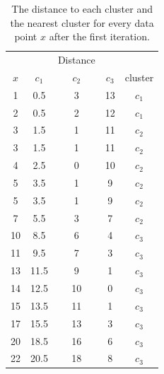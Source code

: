 \documentclass{article}
\begin{document}
\begin{table}[h!]
\centering
\begin{tabular}{c c c c c}
& & Distance & & \\
 $x$ & $c_1$ & $c_2$ & $c_3$ & cluster\\
\hline
1 & 0.5 & 3 & 13 &$c_1$\\
2 & 0.5 & 2 & 12 & $c_1$\\
3 & 1.5 & 1 & 11 &$c_2$\\
3 & 1.5 & 1 & 11 & $c_2$\\
4 & 2.5 & 0  & 10 &$c_2$ \\
5 & 3.5 & 1 & 9 & $c_2$ \\
5 & 3.5 & 1 & 9 & $c_2$\\
7 & 5.5 & 3 & 7 & $c_2$\\
10 & 8.5  & 6 & 4 &$c_3$ \\
11 & 9.5  & 7 & 3 & $c_3$\\
13 & 11.5  & 9 & 1 & $c_3$ \\
14 & 12.5  & 10 & 0 & $c_3$\\
15 & 13.5  & 11 & 1 &$c_3$ \\
17 & 15.5  & 13 & 3 & $c_3$\\
20 & 18.5  & 16 & 6 &$c_3$ \\
22 & 20.5  & 18 & 8 & $c_3$ \\
\end{tabular}
\caption{The distance to each cluster and the nearest cluster  for every data point $x$ after the first iteration.}
\label{tab:second}
\end{table}
\end{document}
